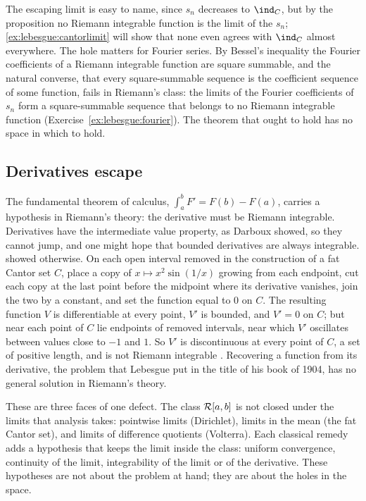 \begin{refsection}
The escaping limit is easy to name, since $s_n$ decreases to $\ind_C$, but by the proposition no Riemann integrable function is the limit of the $s_n$; \cref{ex:lebesgue:cantorlimit} will show that none even agrees with $\ind_C$ almost everywhere. The hole matters for Fourier series. By Bessel's inequality the Fourier coefficients of a Riemann integrable function are square summable, and the natural converse, that every square-summable sequence is the coefficient sequence of some function, fails in Riemann's class: the limits of the Fourier coefficients of $s_n$ form a square-summable sequence that belongs to no Riemann integrable function (Exercise~\ref{ex:lebesgue:fourier}). The theorem that ought to hold has no space in which to hold.

\subsection{Derivatives escape}\label{sec:lebesgue:derivatives}

The fundamental theorem of calculus, $\int_a^bF'=F(b)-F(a)$, carries a hypothesis in Riemann's theory: the derivative must be Riemann integrable. Derivatives have the intermediate value property, as Darboux showed, so they cannot jump, and one might hope that bounded derivatives are always integrable. \textcite{Volterra1881} showed otherwise. On each open interval removed in the construction of a fat Cantor set $C$, place a copy of $x\mapsto x^2\sin(1/x)$ growing from each endpoint, cut each copy at the last point before the midpoint where its derivative vanishes, join the two by a constant, and set the function equal to $0$ on $C$. The resulting function $V$ is differentiable at every point, $V'$ is bounded, and $V'=0$ on $C$; but near each point of $C$ lie endpoints of removed intervals, near which $V'$ oscillates between values close to $-1$ and $1$. So $V'$ is discontinuous at every point of $C$, a set of positive length, and is not Riemann integrable \parencite[for details see][]{Bressoud2008}. Recovering a function from its derivative, the problem that Lebesgue put in the title of his book of 1904, has no general solution in Riemann's theory.

These are three faces of one defect. The class $\mathcal{R}[a,b]$ is not closed under the limits that analysis takes: pointwise limits (Dirichlet), limits in the mean (the fat Cantor set), and limits of difference quotients (Volterra). Each classical remedy adds a hypothesis that keeps the limit inside the class: uniform convergence, continuity of the limit, integrability of the limit or of the derivative. These hypotheses are not about the problem at hand; they are about the holes in the space.


\end{refsection}
